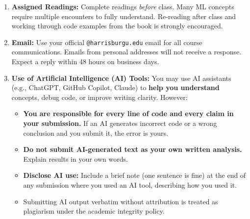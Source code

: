 \documentclass[
  10pt,
]{article}
\providecommand{\tightlist}{%
  \setlength{\itemsep}{0pt}\setlength{\parskip}{0pt}}
\begin{document}
\begin{enumerate}
  \begin{itemize}
  \tightlist
  \item
    Submit as a \textbf{compiled report} (HTML or PDF rendered from
    RMarkdown or Jupyter Notebook). Raw, uncompiled code files
    (\texttt{.R}, \texttt{.py}, \texttt{.ipynb} without output) will not
    be graded and will receive a zero.
  \item
    Each assignment is graded once. Resubmissions are not accepted.
  \item
    \textbf{Late penalty:} 10\% of your earned score is deducted for
    each calendar day late. A score of 85 submitted 2 days late becomes
    85 -- 2(8.5) = \textbf{68}. Submissions more than 10 calendar days
    late receive a \textbf{zero}.
  \item
    All work must be your own. Identical or near-identical answers from
    multiple students, or answers copied verbatim from online sources,
    will receive a zero and may be referred for academic integrity
    review.
  \item
    Cite all sources in APA format (\url{https://www.apa.org/}).
  \item
    If you fall behind or face personal difficulties, reach out
    \emph{early} --- the late policy cannot be waived retroactively, but
    early communication may open other options.
  \end{itemize}
\item
  \textbf{Assigned Readings:} Complete readings \emph{before} class.
  Many ML concepts require multiple encounters to fully understand.
  Re-reading after class and working through code examples from the book
  is strongly encouraged.
\item
  \textbf{Email:} Use your official \texttt{@harrisburgu.edu} email for
  all course communications. Emails from personal addresses will not
  receive a response. Expect a reply within 48 hours on business days.
\item
  \textbf{Use of Artificial Intelligence (AI) Tools:} You may use AI
  assistants (e.g., ChatGPT, GitHub Copilot, Claude) to \textbf{help you
  understand} concepts, debug code, or improve writing clarity. However:

  \begin{itemize}
  \tightlist
  \item
    \textbf{You are responsible for every line of code and every claim
    in your submission.} If an AI generates incorrect code or a wrong
    conclusion and you submit it, the error is yours.
  \item
    \textbf{Do not submit AI-generated text as your own written
    analysis.} Explain results in your own words.
  \item
    \textbf{Disclose AI use:} Include a brief note (one sentence is
    fine) at the end of any submission where you used an AI tool,
    describing how you used it.
  \item
    Submitting AI output verbatim without attribution is treated as
    plagiarism under the academic integrity policy.
  \end{itemize}
\end{enumerate}
\end{document}
